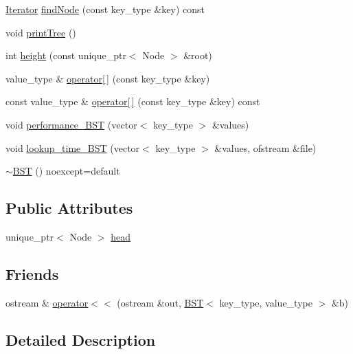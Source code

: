 \begin{DoxyCompactItemize}
\mbox{\hyperlink{class_b_s_t_1_1_iterator}{Iterator}} \mbox{\hyperlink{class_b_s_t_afba6a6e105b99505add378003d233ad4}{find\+Node}} (const key\+\_\+type \&key) const
\item 
void \mbox{\hyperlink{class_b_s_t_a6891f10d9512637607be3783bc55ce2f}{print\+Tree}} ()
\item 
int \mbox{\hyperlink{class_b_s_t_ac4a87a73b520f99529c4a891d5c2d083}{height}} (const unique\+\_\+ptr$<$ Node $>$ \&root)
\item 
value\+\_\+type \& \mbox{\hyperlink{class_b_s_t_aa6d8849086bdfbf2592e017f3b107dd6}{operator\mbox{[}$\,$\mbox{]}}} (const key\+\_\+type \&key)
\item 
const value\+\_\+type \& \mbox{\hyperlink{class_b_s_t_a21c632ae47e4bf5e54b6d5155fd91d2e}{operator\mbox{[}$\,$\mbox{]}}} (const key\+\_\+type \&key) const
\item 
void \mbox{\hyperlink{class_b_s_t_a1d22aaed97163f0f352f6d844c48a813}{performance\+\_\+\+B\+ST}} (vector$<$ key\+\_\+type $>$ \&values)
\item 
void \mbox{\hyperlink{class_b_s_t_a24d4502a47d3eb6d3ad9a93c7106afb1}{lookup\+\_\+time\+\_\+\+B\+ST}} (vector$<$ key\+\_\+type $>$ \&values, ofstream \&file)
\item 
\mbox{\hyperlink{class_b_s_t_aff56473bdcfa7353c0a75415b297e0f2}{$\sim$\+B\+ST}} () noexcept=default
\end{DoxyCompactItemize}
\subsection*{Public Attributes}
\begin{DoxyCompactItemize}
\item 
unique\+\_\+ptr$<$ Node $>$ \mbox{\hyperlink{class_b_s_t_a4e8687535054becc0b625a3ef89c3bd2}{head}}
\end{DoxyCompactItemize}
\subsection*{Friends}
\begin{DoxyCompactItemize}
\item 
ostream \& \mbox{\hyperlink{class_b_s_t_a7785dba8dbfc8ef5e5f8f36bdd19fe58}{operator$<$$<$}} (ostream \&out, \mbox{\hyperlink{class_b_s_t}{B\+ST}}$<$ key\+\_\+type, value\+\_\+type $>$ \&b)
\end{DoxyCompactItemize}


\subsection{Detailed Description}
